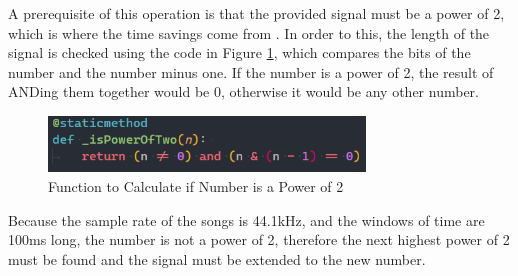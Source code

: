 \documentclass[UTF8, 12pt]{article}
\begin{document}
    A prerequisite of this operation is that the provided signal must be a power of 2, which is where the time savings come from \cite{fft_wiki}. In order to this, the length of the signal is checked using the code in Figure \ref{check2_fig}, which compares the bits of the number and the number minus one. If the number is a power of 2, the result of ANDing them together would be 0, otherwise it would be any other number.
    \begin{figure}[h]
        \centering
        \includegraphics[width=0.75\textwidth]{check2.png}
        \caption{Function to Calculate if Number is a Power of 2}
        \label{check2_fig}
    \end{figure}
    Because the sample rate of the songs is 44.1kHz, and the windows of time are 100ms long, the number is not a power of 2, therefore the next highest power of 2 must be found and the signal must be extended to the new number.
\end{document}
